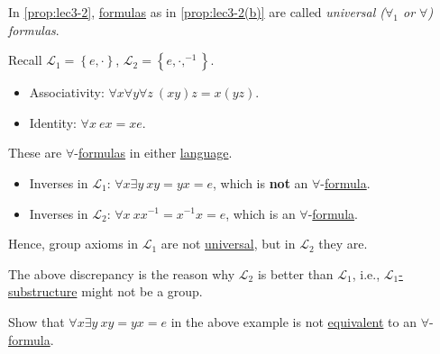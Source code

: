 \begin{notation}[Universal]\label{not:universal}
	In \autoref{prop:lec3-2}, \hyperref[def:formula]{formulas} as in \autoref{prop:lec3-2(b)} are called \emph{universal (\(\forall _1\) or \(\forall \)) formulas}.
\end{notation}

\begin{eg}
	Recall \(\mathcal{L} _1 = \left\{ e, \cdot \right\} \), \(\mathcal{L} _2=\left\{ e, \cdot, ^{-1} \right\} \).
	\begin{itemize}
		\item Associativity: \(\forall x \forall y \forall z\ (xy)z = x(yz)\).
		\item Identity: \(\forall x\ ex = xe\).
	\end{itemize}
	These are \(\forall \)-\hyperref[def:formula]{formulas} in either \hyperref[def:language]{language}.
	\begin{itemize}
		\item Inverses in \(\mathcal{L} _1\): \(\forall x \exists y\ xy = yx = e\), which is \textbf{not} an \(\forall \)-\hyperref[def:formula]{formula}.
		\item Inverses in \(\mathcal{L} _2\): \(\forall x\ x x ^{-1} = x ^{-1} x = e\), which is an \(\forall \)-\hyperref[def:formula]{formula}.
	\end{itemize}
	Hence, group axioms in \(\mathcal{L} _1\) are not \hyperref[def:universal]{universal}, but in \(\mathcal{L} _2\) they are.
\end{eg}

The above discrepancy is the reason why \(\mathcal{L} _2\) is better than \(\mathcal{L} _1\), i.e., \hyperref[def:substructure]{\(\mathcal{L} _1\)-substructure} might not be a group.

\begin{problem*}
	Show that \(\forall x \exists y\ xy = yx = e\) in the above example is not \hyperref[def:equivalent]{equivalent} to an \(\forall \)-\hyperref[def:formula]{formula}.
\end{problem*}